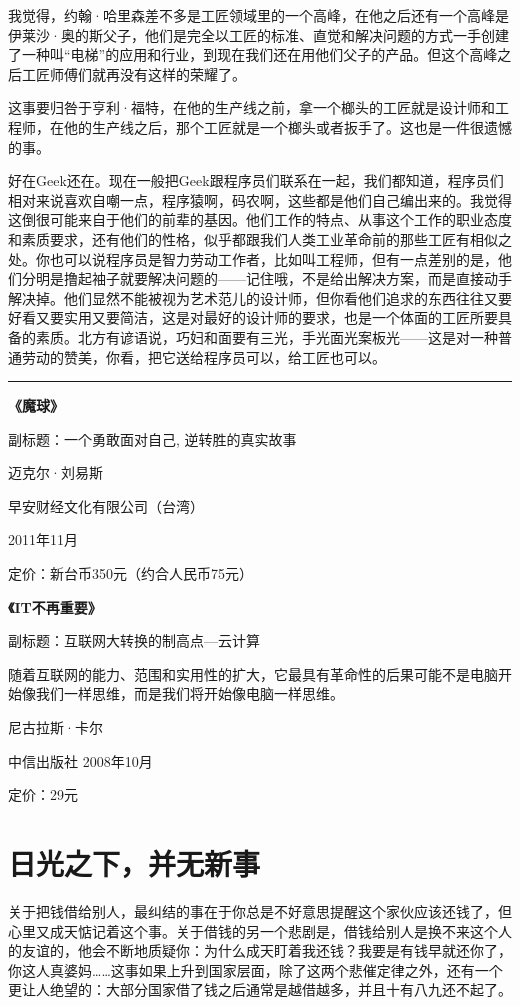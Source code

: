 我觉得，约翰·哈里森差不多是工匠领域里的一个高峰，在他之后还有一个高峰是伊莱沙·奥的斯父子，他们是完全以工匠的标准、直觉和解决问题的方式一手创建了一种叫``电梯''的应用和行业，到现在我们还在用他们父子的产品。但这个高峰之后工匠师傅们就再没有这样的荣耀了。

这事要归咎于亨利·福特，在他的生产线之前，拿一个榔头的工匠就是设计师和工程师，在他的生产线之后，那个工匠就是一个榔头或者扳手了。这也是一件很遗憾的事。

好在Geek还在。现在一般把Geek跟程序员们联系在一起，我们都知道，程序员们相对来说喜欢自嘲一点，程序猿啊，码农啊，这些都是他们自己编出来的。我觉得这倒很可能来自于他们的前辈的基因。他们工作的特点、从事这个工作的职业态度和素质要求，还有他们的性格，似乎都跟我们人类工业革命前的那些工匠有相似之处。你也可以说程序员是智力劳动工作者，比如叫工程师，但有一点差别的是，他们分明是撸起袖子就要解决问题的------记住哦，不是给出解决方案，而是直接动手解决掉。他们显然不能被视为艺术范儿的设计师，但你看他们追求的东西往往又要好看又要实用又要简洁，这是对最好的设计师的要求，也是一个体面的工匠所要具备的素质。北方有谚语说，巧妇和面要有三光，手光面光案板光------这是对一种普通劳动的赞美，你看，把它送给程序员可以，给工匠也可以。

\begin{center}\rule{3in}{0.4pt}\end{center}

\textbf{《魔球》}

副标题：一个勇敢面对自己, 逆转胜的真实故事

迈克尔·刘易斯

早安财经文化有限公司（台湾）

2011年11月

定价：新台币350元（约合人民币75元）

\textbf{《IT不再重要》}

副标题：互联网大转换的制高点---云计算

随着互联网的能力、范围和实用性的扩大，它最具有革命性的后果可能不是电脑开始像我们一样思维，而是我们将开始像电脑一样思维。

尼古拉斯·卡尔

中信出版社 2008年10月

定价：29元

\section{日光之下，并无新事}

关于把钱借给别人，最纠结的事在于你总是不好意思提醒这个家伙应该还钱了，但心里又成天惦记着这个事。关于借钱的另一个悲剧是，借钱给别人是换不来这个人的友谊的，他会不断地质疑你：为什么成天盯着我还钱？我要是有钱早就还你了，你这人真婆妈\ldots{}\ldots{}这事如果上升到国家层面，除了这两个悲催定律之外，还有一个更让人绝望的：大部分国家借了钱之后通常是越借越多，并且十有八九还不起了。

